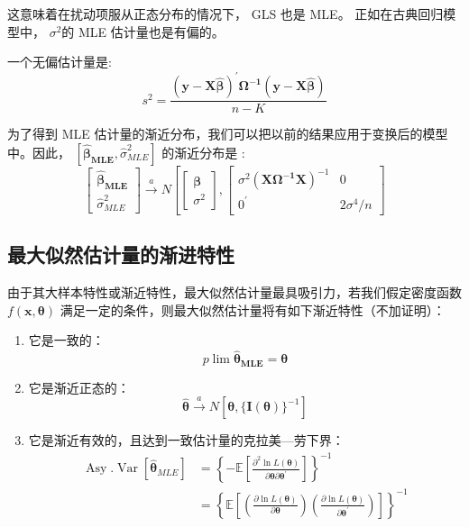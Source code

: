 这意味着在扰动项服从正态分布的情况下， GLS 也是 MLE。 正如在古典回归模型中， $ \sigma^{2} $的 MLE 估计量也是有偏的。

一个无偏估计量是:
$$ s^{2} = \frac{\boldsymbol{ (y-X \hat{\beta})^{\prime} \Omega^{-1}(y-X \hat{\beta})} }{n-K} $$

为了得到 MLE 估计量的渐近分布，我们可以把以前的结果应用于变换后的模型中。因此，
$ \left[ \boldsymbol{ \hat{\beta}_{M L E} }, \hat{\sigma}_{M L E}^{2}\right] $ 的渐近分布是 :
$$ \left[\begin{array}{c}
    \boldsymbol{ \hat{\beta}_{M L E} }\\
    \hat{\sigma}_{M L E}^{2}
    \end{array}\right] \stackrel{a}{\longrightarrow} N\left[\left[\begin{array}{l}
    \boldsymbol{\beta} \\
    \sigma^{2}
    \end{array}\right],\left[\begin{array}{cc}
    \sigma^{2}\left( \boldsymbol{X \Omega^{-1} X}\right)^{-1} & 0 \\
    0^{\prime} & 2 \sigma^{4} / n
    \end{array}\right]\right. $$

\subsection{最大似然估计量的渐进特性}
由于其大样本特性或渐近特性，最大似然估计量最具吸引力，若我们假定密度函数$ f(\boldsymbol{x, \theta}) $
满足一定的条件，则最大似然估计量将有如下渐近特性（不加证明）：
\begin{enumerate}
    \item 它是一致的：
    $$ p \lim \boldsymbol{\hat{\theta}_{M L E}=\theta} $$
    \item 它是渐近正态的：
    $$ \boldsymbol{\hat{\theta}} \stackrel{a}{\longrightarrow} N\left[ \boldsymbol{\theta} ,\{ \boldsymbol{I(\theta)}\}^{-1}\right] $$
    \item 它是渐近有效的，且达到一致估计量的克拉美—劳下界：
    $$ \begin{aligned}
        \operatorname{Asy}.\operatorname{Var}\left[\boldsymbol{\hat{\theta}}_{M L E}\right] &
        =\left\{-\mathbb{E}\left[\frac{\partial^{2} \ln L(\boldsymbol{\theta})}{\partial \boldsymbol{\theta} \partial \boldsymbol{\theta^{\prime}}}\right]\right\}^{-1} \\
        &=\left\{\mathbb{E}\left[\left(\frac{\partial \ln L(\boldsymbol{\theta})}{\partial \boldsymbol{\theta}}\right)
        \left(\frac{\partial \ln L(\boldsymbol{\theta})}{\partial \boldsymbol{\theta^{\prime}}}\right)\right]\right\}^{-1}
        \end{aligned} $$
\end{enumerate}

